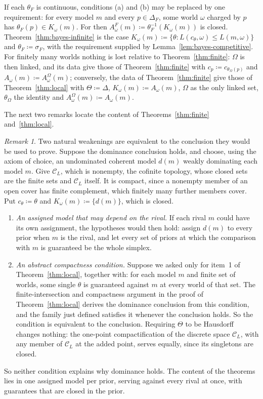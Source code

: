 \documentclass[11pt]{article}
\theoremstyle{definition}
\theoremstyle{remark}
\newtheorem{remark}[theorem]{Remark}
\newcommand{\C}{\mathcal C}
\begin{document}
If each $\theta_F$ is continuous, conditions (a) and (b) may be replaced by one requirement: for every model $m$ and every $p\in\Delta_F$, some world $\omega$ charged by $p$ has $\theta_F(p)\in K_\omega(m)$. For then $A^F_\omega(m)\coloneqq\theta_F^{-1}(K_\omega(m))$ is closed. Theorem~\ref{thm:bayes-infinite} is the case $K_\omega(m)\coloneqq\{\theta:L(c_\theta,\omega)\le L(m,\omega)\}$ and $\theta_F\coloneqq\sigma_F$, with the requirement supplied by Lemma~\ref{lem:bayes-competitive}. For finitely many worlds nothing is lost relative to Theorem~\ref{thm:finite}: $\Omega$ is then linked, and its data give those of Theorem~\ref{thm:finite} with $c_p\coloneqq c_{\theta_\Omega(p)}$ and $A_\omega(m)\coloneqq A^\Omega_\omega(m)$; conversely, the data of Theorem~\ref{thm:finite} give those of Theorem~\ref{thm:local} with $\Theta\coloneqq\Delta$, $K_\omega(m)\coloneqq A_\omega(m)$, $\Omega$ as the only linked set, $\theta_\Omega$ the identity and $A^\Omega_\omega(m)\coloneqq A_\omega(m)$.

The next two remarks locate the content of Theorems~\ref{thm:finite} and~\ref{thm:local}.

\begin{remark}\label{rem:collapse}
Two natural weakenings are equivalent to the conclusion they would be used to prove. Suppose the dominance conclusion holds, and choose, using the axiom of choice, an undominated coherent model $d(m)$ weakly dominating each model $m$. Give $\C_L$, which is nonempty, the cofinite topology, whose closed sets are the finite sets and $\C_L$ itself. It is compact, since a nonempty member of an open cover has finite complement, which finitely many further members cover. Put $c_\theta\coloneqq\theta$ and $K_\omega(m)\coloneqq\{d(m)\}$, which is closed.
\begin{enumerate}[label=(\roman*)]
\item \emph{An assigned model that may depend on the rival.} If each rival $m$ could have its own assignment, the hypotheses would then hold: assign $d(m)$ to every prior when $m$ is the rival, and let every set of priors at which the comparison with $m$ is guaranteed be the whole simplex.
\item \emph{An abstract compactness condition.} Suppose we asked only for item~1 of Theorem~\ref{thm:local}, together with: for each model $m$ and finite set of worlds, some single $\theta$ is guaranteed against $m$ at every world of that set. The finite-intersection and compactness argument in the proof of Theorem~\ref{thm:local} derives the dominance conclusion from this condition, and the family just defined satisfies it whenever the conclusion holds. So the condition is equivalent to the conclusion. Requiring $\Theta$ to be Hausdorff changes nothing: the one-point compactification of the discrete space $\C_L$, with any member of $\C_L$ at the added point, serves equally, since its singletons are closed.
\end{enumerate}
So neither condition explains why dominance holds. The content of the theorems lies in one assigned model per prior, serving against every rival at once, with guarantees that are closed in the prior.
\end{remark}
\end{document}
